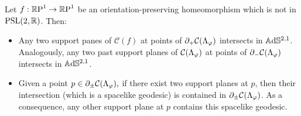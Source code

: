 \begin{lemma}\label{condor}
    Let $f:\S\to\S$ be an orientation-preserving homeomorphism which is not in $\PSL$. Then: 
    \begin{itemize}
        \item Any two support panes of $\mathcal{C}(f)$ at points of $\partial_+\CF$ intersects in $\A^{2,1}$. Analogously, any two past support planes of $\CF$ at points of $\partial_-\CF$ intersects in $\A^{2,1}$.
        \item Given a point $p\in\partial_\pm\CF,$ if there exist two support planes at $p$, then their intersection (which is a spacelike geodesic) is contained in $\partial_\pm\CF$. As a consequence, any other support plane at $p$ contains this spacelike geodesic.
    \end{itemize}
\end{lemma}

